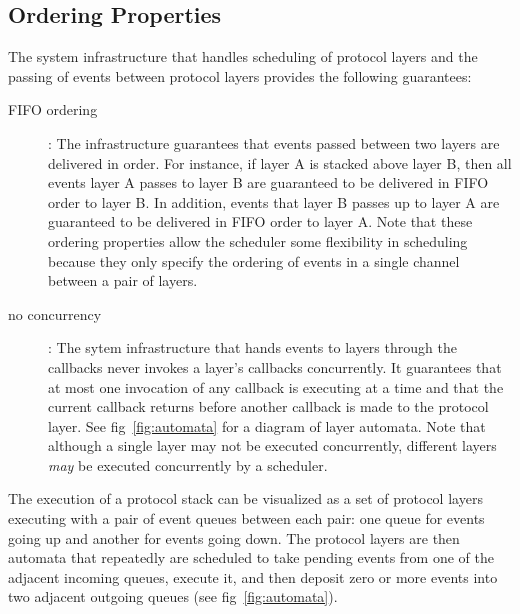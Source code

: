 \subsection{Ordering Properties}
The system infrastructure that handles scheduling of protocol layers and
the passing of events between protocol layers provides the following
guarantees:
\begin{description}
\item
[FIFO ordering] : The infrastructure guarantees that events passed between
two layers are delivered in order.  For instance, if layer A is stacked
above layer B, then all events layer A passes to layer B are guaranteed to
be delivered in FIFO order to layer B.  In addition, events that layer B
passes up to layer A are guaranteed to be delivered in FIFO order to layer
A.  Note that these ordering properties allow the scheduler some
flexibility in scheduling because they only specify the ordering of events
in a single channel between a pair of layers.
\item
[no concurrency] : The sytem infrastructure that hands events to layers
through the callbacks never invokes a layer's callbacks concurrently.  It
guarantees that at most one invocation of any callback is executing at a
time and that the current callback returns before another callback is made
to the protocol layer.  See fig~\ref{fig:automata} for a diagram of layer
automata.  Note that although a single layer may not be executed
concurrently, different layers \emph{may} be executed concurrently by a
scheduler.
\end{description}
The execution of a protocol stack can be visualized as a set of protocol
layers executing with a pair of event queues between each pair: one queue
for events going up and another for events going down.  The protocol layers
are then automata that repeatedly are scheduled to take pending events from
one of the adjacent incoming queues, execute it, and then deposit zero or
more events into two adjacent outgoing queues (see fig~\ref{fig:automata}).
